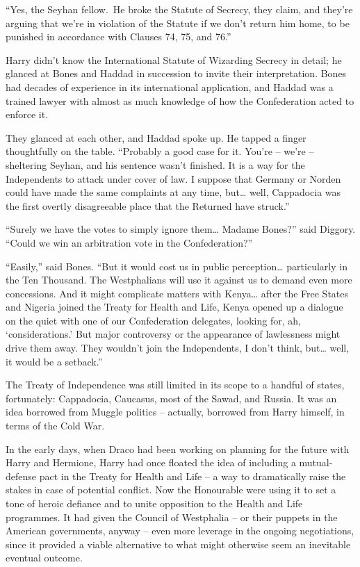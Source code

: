 ``Yes, the Seyhan fellow.~He broke the Statute of Secrecy, they claim,
and they're arguing that we're in violation of the Statute if we don't
return him home, to be punished in accordance with Clauses 74, 75, and
76.''

Harry didn't know the International Statute of Wizarding Secrecy in
detail; he glanced at Bones and Haddad in succession to invite their
interpretation. Bones had decades of experience in its international
application, and Haddad was a trained lawyer with almost as much
knowledge of how the Confederation acted to enforce it.

They glanced at each other, and Haddad spoke up. He tapped a finger
thoughtfully on the table. ``Probably a good case for it. You're --
we're -- sheltering Seyhan, and his sentence wasn't finished. It is a
way for the Independents to attack under cover of law. I suppose that
Germany or Norden could have made the same complaints at any time,
but\ldots{} well, Cappadocia was the first overtly disagreeable place
that the Returned have struck.''

``Surely we have the votes to simply ignore them\ldots{} Madame Bones?''
said Diggory. ``Could we win an arbitration vote in the Confederation?''

``Easily,'' said Bones. ``But it would cost us in public
perception\ldots{} particularly in the Ten Thousand. The Westphalians
will use it against us to demand even more concessions. And it might
complicate matters with Kenya\ldots{} after the Free States and Nigeria
joined the Treaty for Health and Life, Kenya opened up a dialogue on the
quiet with one of our Confederation delegates, looking for, ah,
`considerations.' But major controversy or the appearance of lawlessness
might drive them away. They wouldn't join the Independents, I don't
think, but\ldots{} well, it would be a setback.''

The Treaty of Independence was still limited in its scope to a handful
of states, fortunately: Cappadocia, Caucasus, most of the Sawad, and
Russia. It was an idea borrowed from Muggle politics -- actually,
borrowed from Harry himself, in terms of the Cold War.

In the early days, when Draco had been working on planning for the
future with Harry and Hermione, Harry had once floated the idea of
including a mutual-defense pact in the Treaty for Health and Life -- a
way to dramatically raise the stakes in case of potential conflict. Now
the Honourable were using it to set a tone of heroic defiance and to
unite opposition to the Health and Life programmes. It had given the
Council of Westphalia -- or their puppets in the American governments,
anyway -- even more leverage in the ongoing negotiations, since it
provided a viable alternative to what might otherwise seem an inevitable
eventual outcome.

